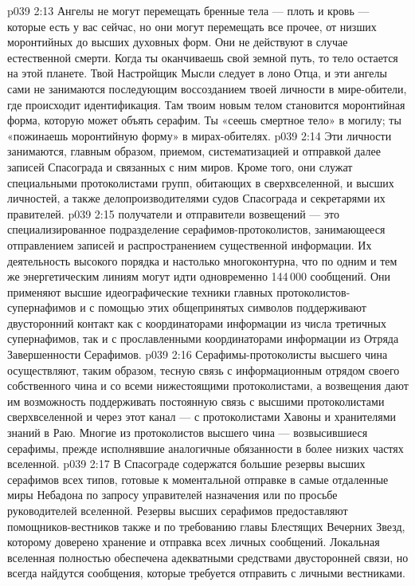 \vs p039 2:13 \pc Ангелы не могут перемещать бренные тела --- плоть и кровь --- которые есть у вас сейчас, но они могут перемещать все прочее, от низших моронтийных до высших духовных форм. Они не действуют в случае естественной смерти. Когда ты оканчиваешь свой земной путь, то тело остается на этой планете. Твой Настройщик Мысли следует в лоно Отца, и эти ангелы сами не занимаются последующим воссозданием твоей личности в мире\hyp{}обители, где происходит идентификация. Там твоим новым телом становится моронтийная форма, которую может объять серафим. Ты «сеешь смертное тело» в могилу; ты «пожинаешь моронтийную форму» в мирах\hyp{}обителях.
\vs p039 2:14 \bibnobreakspace {} Эти личности занимаются, главным образом, приемом, систематизацией и отправкой далее записей Спасограда и связанных с ним миров. Кроме того, они служат специальными протоколистами групп, обитающих в сверхвселенной, и высших личностей, а также делопроизводителями судов Спасограда и секретарями их правителей.
\vs p039 2:15 \pc {} получатели и отправители возвещений --- это специализированное подразделение серафимов\hyp{}протоколистов, занимающееся отправлением записей и распространением существенной информации. Их деятельность высокого порядка и настолько многоконтурна, что по одним и тем же энергетическим линиям могут идти одновременно 144\,000 сообщений. Они применяют высшие идеографические техники главных протоколистов\hyp{}супернафимов и с помощью этих общепринятых символов поддерживают двусторонний контакт как с координаторами информации из числа третичных супернафимов, так и с прославленными координаторами информации из Отряда Завершенности Серафимов.
\vs p039 2:16 Серафимы\hyp{}протоколисты высшего чина осуществляют, таким образом, тесную связь с информационным отрядом своего собственного чина и со всеми нижестоящими протоколистами, а возвещения дают им возможность поддерживать постоянную связь с высшими протоколистами сверхвселенной и через этот канал --- с протоколистами Хавоны и хранителями знаний в Раю. Многие из протоколистов высшего чина --- возвысившиеся серафимы, прежде исполнявшие аналогичные обязанности в более низких частях вселенной.
\vs p039 2:17 \bibnobreakspace {} В Спасограде содержатся большие резервы высших серафимов всех типов, готовые к моментальной отправке в самые отдаленные миры Небадона по запросу управителей назначения или по просьбе руководителей вселенной. Резервы высших серафимов предоставляют помощников\hyp{}вестников также и по требованию главы Блестящих Вечерних Звезд, которому доверено хранение и отправка всех личных сообщений. Локальная вселенная полностью обеспечена адекватными средствами двусторонней связи, но всегда найдутся сообщения, которые требуется отправить с личными вестниками.
